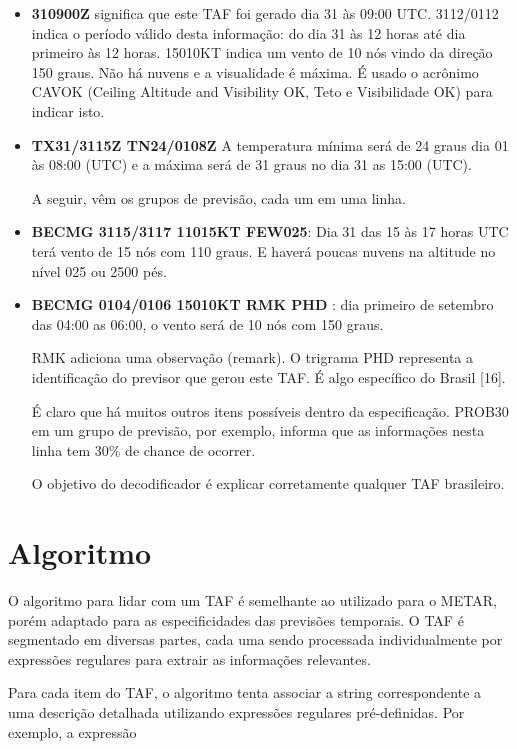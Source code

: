 \begin{itemize}
\item \textbf{310900Z} significa que este TAF foi gerado dia 31 às 09:00 UTC. 3112/0112 indica 
o período válido desta informação: do dia 31 às 
12 horas até dia primeiro às 12 horas. 15010KT indica um vento de 10 nós vindo 
da direção 150 graus. Não há nuvens e a visualidade é máxima. É usado o acrônimo 
CAVOK (Ceiling Altitude and Visibility OK, Teto e Visibilidade OK) para indicar isto.

\item \textbf{TX31/3115Z TN24/0108Z} A temperatura mínima será de 24 graus dia 01 às 08:00 (UTC) e a máxima será 
de 31 graus no dia 31 as 15:00 (UTC).

A seguir, vêm os grupos de previsão, cada um em uma linha.

\item \textbf{BECMG 3115/3117 11015KT FEW025}: Dia 31 das 15 às 17 horas UTC terá vento de 
15 nós com 110 graus. E haverá poucas nuvens na altitude no nível 025 ou 2500 pés.

\item \textbf{BECMG 0104/0106 15010KT RMK PHD} : dia primeiro de setembro das 04:00 as 06:00, 
o vento será de 10 nós com 150 graus.

RMK adiciona uma observação (remark). O trigrama PHD representa a identificação 
do previsor que gerou este TAF. É algo específico do Brasil [16].

É claro que há muitos outros itens possíveis dentro da especificação. PROB30 em 
um grupo de previsão, por exemplo, informa que as informações nesta linha tem 
30\% de chance de ocorrer.

O objetivo do decodificador é explicar corretamente qualquer TAF brasileiro.
\end{itemize}

\section{Algoritmo}

O algoritmo para lidar com um TAF é semelhante ao utilizado para o METAR, porém adaptado
para as especificidades das previsões temporais. O TAF é segmentado em diversas
partes, cada uma sendo processada individualmente por expressões regulares para extrair as
informações relevantes.

Para cada item do TAF, o algoritmo tenta associar a string correspondente a uma descrição
detalhada utilizando expressões regulares pré-definidas. Por exemplo, a expressão

